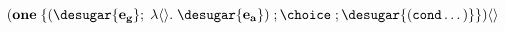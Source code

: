 \documentclass[]{article}
\begin{document}
$$
(\bf{one}\; \{(\desugar{e_{g}} ;\; \lambda\langle\rangle.\; \desugar{e_{a}})\; ; \choice\; ;
\desugar{\tt{(cond \dots)}}\})\langle\rangle  \\
$$  




















\end{document}
